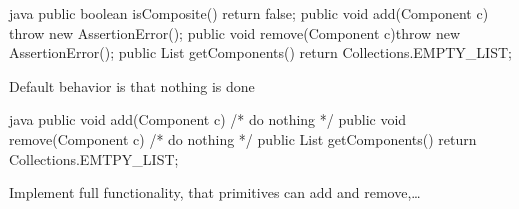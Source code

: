 \begin{codeboxNl}{java}
  public boolean isComposite() { return false; }
  public void add(Component c) { throw new AssertionError(); }
  public void remove(Component c){throw new AssertionError();}
  public List getComponents() {return Collections.EMPTY_LIST;}
\end{codeboxNl}
\begin{sectionbox}[Solution 4]\nospacing
  Default behavior is that nothing is done
\end{sectionbox}
\begin{codeboxNl}{java}
  public void add(Component c) {    /* do nothing */ }
  public void remove(Component c) { /* do nothing */ }
  public List getComponents() {return Collections.EMTPY_LIST;}
\end{codeboxNl}
\begin{sectionbox}[Solution 5]\nospacing
  Implement full functionality, that primitives can add and remove,\ldots
\end{sectionbox}

